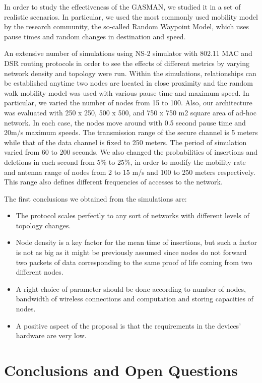 \documentclass[conference]{IEEEtran}
\begin{document}
In order to study the effectiveness of the GASMAN, we studied it in a set of realistic scenarios. In particular, we used the most commonly used mobility model by the research community, the so-called Random Waypoint Model, which uses pause times and random changes in destination and speed.

An extensive number of simulations using NS-2 simulator with 802.11 MAC and DSR
routing protocols in order to see the effects of different metrics by varying network density and topology were run. Within the simulations, relationships can be established anytime two nodes are located in close proximity and the random walk mobility model was used with various pause time and maximum speed. In particular, we varied the number of nodes from 15 to 100. Also, our architecture was evaluated with 250 x 250, 500 x 500, and 750 x 750 m2 square area of ad-hoc network. In each case, the nodes move around with 0.5
second pause time and 20m/s maximum speeds. The transmission range of the
secure channel is 5 meters while that of the data channel is fixed to 250 meters.
The period of simulation varied from 60 to 200 seconds. We also changed the
probabilities of insertions and deletions in each second from 5\%
to 25\%, in order to modify the mobility rate and antenna range of
nodes from 2 to 15 m/s and 100 to 250 meters respectively. This
range also defines different frequencies of accesses to the
network.

The first conclusions we obtained from the simulations
are:
\begin{itemize}
\item The  protocol  scales perfectly to any sort of networks with different levels of topology changes.
\item Node density is a key factor for the mean time of insertions, but such a factor is not as big as it might be
 previously assumed since nodes do not forward two packets of data corresponding to the same proof of life
 coming from two different nodes.
\item A right choice of parameter  should be done according to number of nodes, bandwidth of wireless connections and
computation and storing capacities of nodes.
\item  A positive aspect of the proposal is that the requirements in the devices' hardware are very low.
\end{itemize}


\section{Conclusions and Open Questions}
\end{document}
